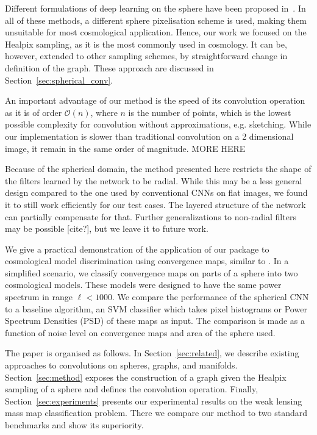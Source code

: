 \documentclass[final,twocolumn,3p,times,authoryear]{elsarticle}
\newcommand{\nati}[1]{{\color[rgb]{.1,.6,.1}{#1}}}
\newcommand{\secref}[1]{Section~\ref{sec:#1}}
\newcommand{\1}{\b{1}}              %
\newcommand{\0}{\b{0}}              %
\begin{document}
Different formulations of deep learning on the sphere have been proposed in~\citet{cohen2017convolutional,cohen2018spherical,boomsma2017spherical,khasanova2017graph}.
In all of these methods, a different sphere pixelisation scheme is used, making them unsuitable for most cosmological application. 
Hence, our work we focused on the Healpix sampling, as it is the most commonly used in cosmology.
It can be, however, extended to other sampling schemes, by straightforward change in definition of the graph. These approach are discussed in Section~\ref{sec:spherical_conv}.

An important advantage of our method is the speed of its convolution operation as it is of order $\mathcal{O}(n)$, where $n$ is the number of points, which is the lowest possible complexity for convolution without approximations, e.g. sketching.
While our implementation is slower than traditional convolution on a 2 dimensional image, it remain in the same order of magnitude.
MORE HERE

Because of the spherical domain, the method presented here restricts the shape of the filters learned by the network to be radial.
While this may be a less general design compared to the one used by conventional CNNs on flat images, we found it to still work efficiently for our test cases.
The layered structure of the network can partially compensate for that.
Further generalizations to non-radial filters may be possible [cite?], but we leave it to future work.

We give a practical demonstration of the application of our package to cosmological model discrimination using convergence maps, similar to \citep{schmelze2017cosmologicalmodel}.
In a simplified scenario, we classify convergence maps on parts of a sphere into two cosmological models.
These models were designed to have the same power spectrum in range $\ell < 1000$.
We compare the performance of the spherical CNN to a baseline algorithm, an SVM classifier which takes pixel histograms or Power Spectrum Densities (PSD) of these maps as input.
The comparison is made as a function of noise level on convergence maps and area of the sphere used.

The paper is organised as follows.
In \secref{related}, we describe existing approaches to convolutions on spheres, graphs, and manifolds.
\secref{method} exposes the construction of a graph given the Healpix sampling of a sphere and defines the convolution operation.
Finally, \secref{experiments} presents our experimental results on the weak lensing mass map classification problem. There we compare our method to two standard benchmarks and show its superiority.
\end{document}
